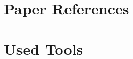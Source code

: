 \section{Paper References}
\label{sec: paper_references}%


\section{Used Tools}
\label{sec: used_tools}%
